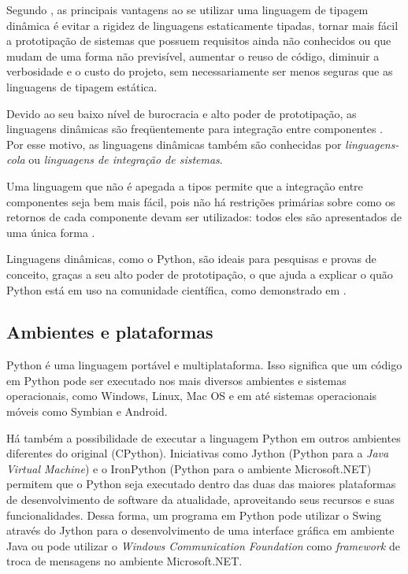 Segundo \cite{dynamic_langs}, as principais vantagens ao se utilizar uma linguagem de tipagem dinâmica é evitar a rigidez de linguagens estaticamente tipadas, tornar mais fácil a prototipação de sistemas que possuem requisitos ainda não conhecidos ou que mudam de uma forma não previsível, aumentar o reuso de código, diminuir a verbosidade e o custo do projeto, sem necessariamente ser menos seguras que as linguagens de tipagem estática.

Devido ao seu baixo nível de burocracia e alto poder de prototipação, as linguagens dinâmicas são freqüentemente para integração entre componentes \cite{scripting}. Por esse motivo, as linguagens dinâmicas também são conhecidas por \emph{linguagens-cola} ou \emph{linguagens de integração de sistemas}.

Uma linguagem que não é apegada a tipos permite que a integração entre componentes seja bem mais fácil, pois não há restrições primárias sobre como os retornos de cada componente devam ser utilizados: todos eles são apresentados de uma única forma \cite{scripting}.

Linguagens dinâmicas, como o Python, são ideais para pesquisas e provas de conceito, graças a seu alto poder de prototipação, o que ajuda a explicar o quão Python está em uso na comunidade científica, como demonstrado em \cite{python_scientific_world}.

\subsection{Ambientes e plataformas}

Python é uma linguagem portável e multiplataforma. Isso significa que um código em Python pode ser executado nos mais diversos ambientes e sistemas operacionais, como Windows, Linux, Mac OS e em até sistemas operacionais móveis como Symbian e Android.

Há também a possibilidade de executar a linguagem Python em outros ambientes diferentes do original (CPython). Iniciativas como Jython (Python para a \emph{Java Virtual Machine}) e o IronPython (Python para o ambiente Microsoft.NET) permitem que o Python seja executado dentro das duas das maiores plataformas de desenvolvimento de software da atualidade, aproveitando seus recursos e suas funcionalidades. Dessa forma, um programa em Python pode utilizar o Swing através do Jython para o desenvolvimento de uma interface gráfica em ambiente Java ou pode utilizar o \emph{Windows Communication Foundation} como \emph{framework} de troca de mensagens no ambiente Microsoft.NET.

